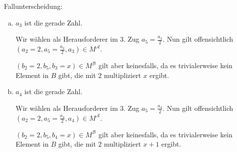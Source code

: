 \documentclass[a4paper,10pt]{article}
\begin{document}
Fallunterscheidung:
\begin{enumerate}[(a)]
\item $a_3$ ist die gerade Zahl.

Wir wählen als Herausforderer im 3. Zug $a_5 = \frac{a_3}{2}$.
Nun gilt offensichtlich $\left(a_2 = 2,a_5 = \frac{a_3}{2},a_3\right) \in M^{\mathcal A}$.

$\left(b_2 = 2,b_5,b_3 = x\right) \in M^{\mathcal B}$ gilt aber keinesfalls, da es trivialerweise kein Element in $B$ gibt, die mit $2$ multipliziert $x$ ergibt.
\item $a_4$ ist die gerade Zahl.

Wir wählen als Herausforderer im 3. Zug $a_5 = \frac{a_4}{2}$.
Nun gilt offensichtlich $\left(a_2 = 2,a_5 = \frac{a_4}{2},a_4\right) \in M^{\mathcal A}$.

$\left(b_2 = 2,b_5,b_4 = x\right) \in M^{\mathcal B}$ gilt aber keinesfalls, da es trivialerweise kein Element in $B$ gibt, die mit $2$ multipliziert $x + 1$ ergibt.
\end{enumerate}
\end{document}
